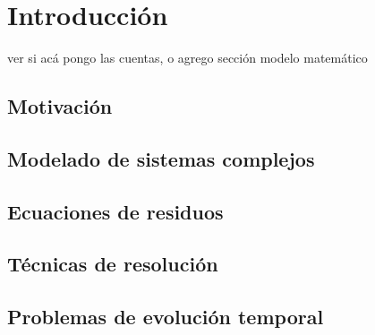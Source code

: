 \chapter{Introducción}

ver si acá pongo las cuentas, o agrego sección modelo matemático

\section{Motivación}
\label{1:motivacion}

\section{Modelado de sistemas complejos}
\label{1:modelado}

\section{Ecuaciones de residuos}
\label{1:ecuaciones}

\section{Técnicas de resolución}
\label{1:tecnicas}

\section{Problemas de evolución temporal}
\label{1:evolucion}